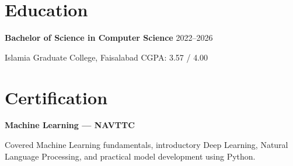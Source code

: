 \documentclass[11pt,a4paper]{article}
\newcommand{\resumeSection}[1]{
    \section*{#1}
}
\newcommand{\resumeItem}[1]{
    \item #1
}
\begin{document}

\resumeSection{Education}

\textbf{Bachelor of Science in Computer Science} \hfill 2022--2026

Islamia Graduate College, Faisalabad \hfill CGPA: 3.57 / 4.00


\resumeSection{Certification}

\textbf{Machine Learning — NAVTTC}

Covered Machine Learning fundamentals, introductory Deep Learning, Natural Language Processing, and practical model development using Python.



\end{document}
